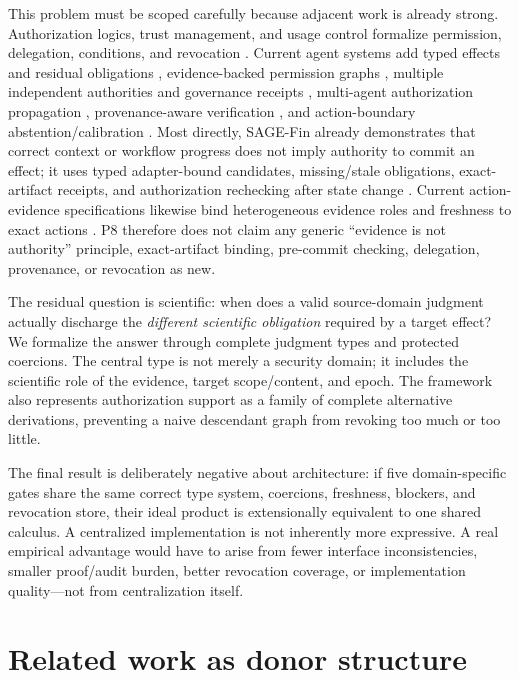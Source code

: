 \documentclass[11pt]{article}
\begin{document}
This problem must be scoped carefully because adjacent work is already strong. Authorization logics, trust management, and usage control formalize permission, delegation, conditions, and revocation \cite{ucon2002,ucon2004,secpal2010}. Current agent systems add typed effects and residual obligations \cite{etas2026}, evidence-backed permission graphs \cite{fava2026}, multiple independent authorities and governance receipts \cite{agentbound2026}, multi-agent authorization propagation \cite{propagation2026}, provenance-aware verification \cite{provguard2026}, and action-boundary abstention/calibration \cite{abstain2026,steerbench2026}. Most directly, SAGE-Fin already demonstrates that correct context or workflow progress does not imply authority to commit an effect; it uses typed adapter-bound candidates, missing/stale obligations, exact-artifact receipts, and authorization rechecking after state change \cite{sagefin2026}. Current action-evidence specifications likewise bind heterogeneous evidence roles and freshness to exact actions \cite{aeb2026,aec2026}. P8 therefore does not claim any generic ``evidence is not authority'' principle, exact-artifact binding, pre-commit checking, delegation, provenance, or revocation as new.

The residual question is scientific: when does a valid source-domain judgment actually discharge the \emph{different scientific obligation} required by a target effect? We formalize the answer through complete judgment types and protected coercions. The central type is not merely a security domain; it includes the scientific role of the evidence, target scope/content, and epoch. The framework also represents authorization support as a family of complete alternative derivations, preventing a naive descendant graph from revoking too much or too little.

The final result is deliberately negative about architecture: if five domain-specific gates share the same correct type system, coercions, freshness, blockers, and revocation store, their ideal product is extensionally equivalent to one shared calculus. A centralized implementation is not inherently more expressive. A real empirical advantage would have to arise from fewer interface inconsistencies, smaller proof/audit burden, better revocation coverage, or implementation quality—not from centralization itself.

\section{Related work as donor structure}
\end{document}
